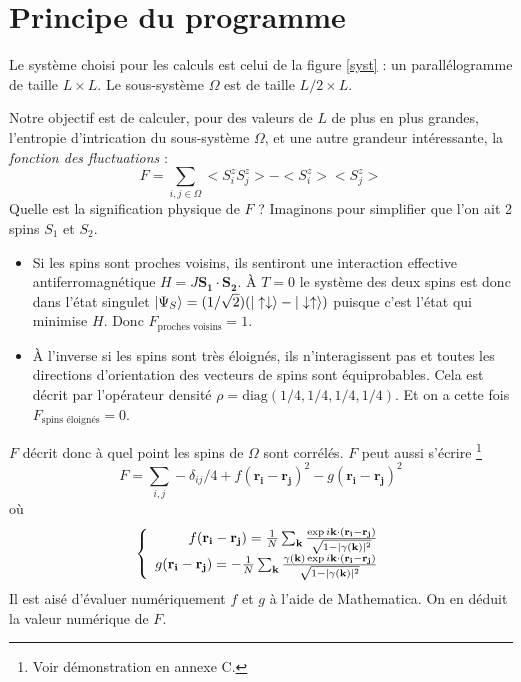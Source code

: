 \documentclass[a4paper, french]{report}
\newcommand{\ket}[1]{\ensuremath{|#1\rangle}\xspace}
\newcommand{\pos}[1]{\ensuremath{\mathbf{r_{#1}}}\xspace}
\newcommand{\ond}{\ensuremath{\mathbf{k}\xspace}}
\newcommand{\gam}{\gamma(\ond{})}
\newcommand{\om}{\ensuremath{\Omega}\xspace}
\newcommand{\1}{\ensuremath{\ket{\om_1\bom_1}}\xspace}
\newcommand{\2}{\ensuremath{\ket{\om_2\bom_2}}\xspace}
\begin{document}
\section{Principe du programme}
\label{sec:pcppgrm}
Le système choisi pour les calculs est celui de la figure \ref{syst} : un parallélogramme de taille $L \times L$. Le sous-système \om est de taille $L/2 \times L$.

Notre objectif est de calculer, pour des valeurs de $L$ de plus en plus grandes, l'entropie d'intrication du sous-système \om, et une autre grandeur intéressante, la \emph{fonction des fluctuations} :
\begin{equation}
	F=\sum_{i,j \in \om} <S_i^zS_j^z>-<S_i^z><S_j^z>
\end{equation}
Quelle est la signification physique de $F$ ? Imaginons pour simplifier que l'on ait 2 spins $S_1$ et $S_2$.
		\begin{itemize}
			\item Si les spins sont proches voisins, ils sentiront une interaction effective antiferromagnétique $H=J\mathbf{S_1}\cdot\mathbf{S_2}$. À $T=0$ le système des deux spins est donc dans l'état singulet $\linebreak[4] \ket{\Psi_S}=(1/\sqrt{2})(\ket{\uparrow \downarrow}-\ket{\downarrow \uparrow})$ puisque c'est l'état qui minimise $H$. Donc $F_{\text{proches voisins}}=1$.
			\item À l'inverse si les spins sont très éloignés, ils n'interagissent pas et toutes les directions d'orientation des vecteurs de spins sont équiprobables. Cela est décrit par l'opérateur densité $\rho=\text{diag}(1/4,1/4,1/4,1/4)$. Et on a cette fois $F_{\text{spins éloignés}}=0$.
		\end{itemize}
$F$ décrit donc à quel point les spins de \om sont corrélés. 
$F$ peut aussi s'écrire \footnote{Voir démonstration en annexe C.}
\begin{equation}
\label{eq:fluctfg}
	F=\sum_{i,j} -\delta_{ij}/4+f(\pos{i}-\pos{j})^2-g(\pos{i}-\pos{j})^2
\end{equation}
où
\begin{equation}
\label{eq:fg}
\left\{
	\begin{array}{r c l}
		f(\pos{i}-\pos{j})=\frac{1}{N}\sum_{\ond{}} \frac{\exp{i\ond\cdot(\pos{i}-\pos{j})}}{\sqrt{1-|\gam|^2}}\\
		g(\pos{i}-\pos{j})=-\frac{1}{N}\sum_{\ond{}} \frac{\gam \exp{i\ond\cdot(\pos{i}-\pos{j})}}{\sqrt{1-|\gam|^2}}
	\end{array}
\right.
\end{equation}
Il est aisé d'évaluer numériquement $f$ et $g$ à l'aide de Mathematica. On en déduit la valeur numérique de $F$.
\end{document}

